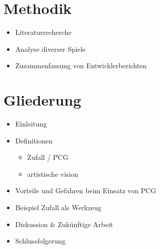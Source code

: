 \documentclass[10pt,a4paper]{article}
\begin{document}
\section{Methodik}
\begin{itemize}
\item Literaturrecherche
\item Analyse diverser Spiele
\item Zusammenfassung von Entwicklerberichten
\end{itemize}

\section{Gliederung}

\begin{itemize}
\item Einleitung
\item Definitionen
\begin{itemize}
\item Zufall / PCG
\item artistische vision
\end{itemize}
\item Vorteile und Gefahren beim Einsatz von PCG
\item Beispiel Zufall als Werkzeug
\item Diskussion \& Zukünftige Arbeit
\item Schlussfolgerung
\end{itemize}


%
%

%


\end{document}
